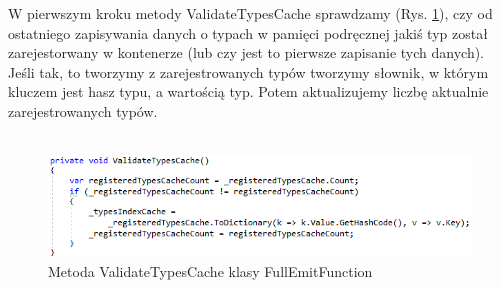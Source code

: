 \documentclass[12pt]{article}
\begin{document}
W pierwszym kroku metody ValidateTypesCache sprawdzamy (Rys. \ref{fig:FullEmitFunction_ValidateTypesCache}), czy od ostatniego zapisywania danych o typach w pamięci podręcznej jakiś typ został zarejestorwany w kontenerze (lub czy jest to pierwsze zapisanie tych danych). Jeśli tak, to tworzymy z zarejestrowanych typów tworzymy słownik, w którym kluczem jest hasz typu, a wartością typ. Potem aktualizujemy liczbę aktualnie zarejestrowanych typów.\\ \\
\begin{figure}[H]
	\begin{center}
  		\includegraphics{FullEmitFunction_ValidateTypesCache.png}
  		\caption{Metoda ValidateTypesCache klasy FullEmitFunction}
  		\label{fig:FullEmitFunction_ValidateTypesCache}
	\end{center}
\end{figure}
\end{document}
